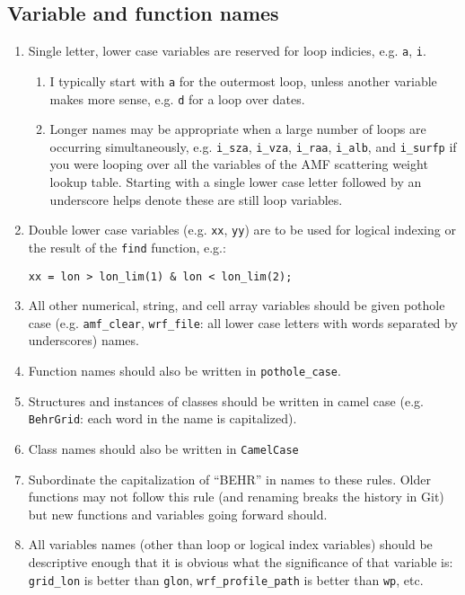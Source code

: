\documentclass[12pt]{article}
\begin{document}
\subsection{Variable and function names}
	\begin{enumerate}
	\item Single letter, lower case variables are reserved for loop indicies, e.g. \lstinline$a$, \lstinline$i$.
		\begin{enumerate}
		\item I typically start with \lstinline$a$ for the outermost loop, unless another variable makes more sense, e.g. \lstinline$d$ for a loop over dates.
		\item Longer names may be appropriate when a large number of loops are occurring simultaneously, e.g. \lstinline$i_sza$, \lstinline$i_vza$, \lstinline$i_raa$, \lstinline$i_alb$, and \lstinline$i_surfp$ if you were looping over all the variables of the AMF scattering weight lookup table. Starting with a single lower case letter followed by an underscore helps denote these are still loop variables.
		\end{enumerate}
	\item Double lower case variables (e.g. \lstinline$xx$, \lstinline$yy$) are to be used for logical indexing or the result of the \lstinline$find$ function, e.g.:
\begin{lstlisting}
xx = lon > lon_lim(1) & lon < lon_lim(2);
\end{lstlisting}

	\item All other numerical, string, and cell array variables should be given pothole case (e.g. \lstinline$amf_clear$, \lstinline$wrf_file$: all lower case letters with words separated by underscores) names.
	
	\item Function names should also be written in \lstinline$pothole_case$.
	
	\item Structures and instances of classes should be written in camel case (e.g. \lstinline$BehrGrid$: each word in the name is capitalized).
	
	\item Class names should also be written in \lstinline$CamelCase$
	
	\item Subordinate the capitalization of ``BEHR'' in names to these rules. Older functions may not follow this rule (and renaming breaks the history in Git) but new functions and variables going forward should.
	
	\item All variables names (other than loop or logical index variables) should be descriptive enough that it is obvious what the significance of that variable is: \lstinline$grid_lon$ is better than \lstinline$glon$, \lstinline$wrf_profile_path$ is better than \lstinline$wp$, etc.
	\end{enumerate}
	
\end{document}
